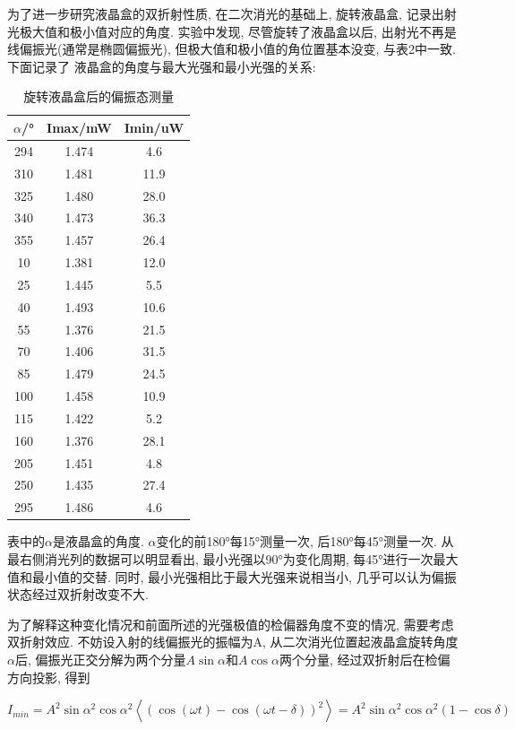 \documentclass[12pt,a4paper]{article}
\newcommand{\be}[1]{
    \begin{equation}
        #1
    \end{equation}
}
\begin{document}
为了进一步研究液晶盒的双折射性质, 在二次消光的基础上, 旋转液晶盒, 记录出射光极大值和极小值对应的角度. 
实验中发现, 尽管旋转了液晶盒以后, 出射光不再是线偏振光(通常是椭圆偏振光), 但极大值和极小值的角位置基本没变, 与表2中一致. 下面记录了
液晶盒的角度与最大光强和最小光强的关系: 
\begin{table}[H]
    \centering
    \begin{tabular}{|c|c|c|}
    \hline
    $\alpha$/° & Imax/mW & Imin/uW \\ \hline
    294     & 1.474   & 4.6     \\ \hline
    310     & 1.481   & 11.9    \\ \hline
    325     & 1.480   & 28.0    \\ \hline
    340     & 1.473   & 36.3    \\ \hline
    355     & 1.457   & 26.4    \\ \hline
    10      & 1.381   & 12.0    \\ \hline
    25      & 1.445   & 5.5     \\ \hline
    40      & 1.493   & 10.6    \\ \hline
    55      & 1.376   & 21.5    \\ \hline
    70      & 1.406   & 31.5    \\ \hline
    85      & 1.479   & 24.5    \\ \hline
    100     & 1.458   & 10.9    \\ \hline
    115     & 1.422   & 5.2     \\ \hline
    160     & 1.376   & 28.1    \\ \hline
    205     & 1.451   & 4.8     \\ \hline
    250     & 1.435   & 27.4    \\ \hline
    295     & 1.486   & 4.6     \\ \hline
    \end{tabular}
    \caption{旋转液晶盒后的偏振态测量}
    \end{table}
表中的$\alpha$是液晶盒的角度. $\alpha$变化的前180°每15°测量一次, 后180°每45°测量一次. 从最右侧消光列的数据可以明显看出, 最小光强以90°为变化周期, 每45°进行一次最大值和最小值的交替. 同时, 
最小光强相比于最大光强来说相当小, 几乎可以认为偏振状态经过双折射改变不大. 

为了解释这种变化情况和前面所述的光强极值的检偏器角度不变的情况, 需要考虑双折射效应. 不妨设入射的线偏振光的振幅为A, 从二次消光位置起液晶盒旋转角度$\alpha$后, 
偏振光正交分解为两个分量$A\sin{\alpha}$和$A\cos{\alpha}$两个分量, 经过双折射后在检偏方向投影, 得到
\be{I_{min}=A^2\sin{\alpha}^2\cos{\alpha}^2\left \langle (\cos{(\omega t) }-\cos{(\omega t -\delta)})^2 \right \rangle  =A^2\sin{\alpha}^2\cos{\alpha}^2(1-\cos{\delta})}
\end{document}
